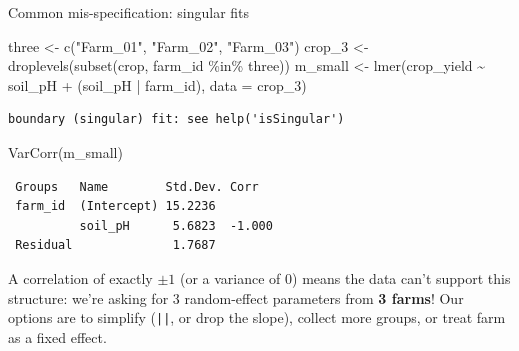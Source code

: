 \documentclass[
  ignorenonframetext,
  aspectratio=169,
]{beamer}
\newenvironment{Shaded}{\begin{snugshade}}{\end{snugshade}}
\newcommand{\AttributeTok}[1]{\textcolor[rgb]{0.40,0.45,0.13}{#1}}
\newcommand{\FunctionTok}[1]{\textcolor[rgb]{0.28,0.35,0.67}{#1}}
\newcommand{\NormalTok}[1]{\textcolor[rgb]{0.00,0.23,0.31}{#1}}
\newcommand{\OtherTok}[1]{\textcolor[rgb]{0.00,0.23,0.31}{#1}}
\newcommand{\SpecialCharTok}[1]{\textcolor[rgb]{0.37,0.37,0.37}{#1}}
\newcommand{\StringTok}[1]{\textcolor[rgb]{0.13,0.47,0.30}{#1}}
\begin{document}
\begin{frame}[fragile]{Common mis-specification: singular fits}
\label{common-mis-specification-singular-fits}
\begin{Shaded}
\begin{Highlighting}[]
\NormalTok{three }\OtherTok{\textless{}{-}} \FunctionTok{c}\NormalTok{(}\StringTok{"Farm\_01"}\NormalTok{, }\StringTok{"Farm\_02"}\NormalTok{, }\StringTok{"Farm\_03"}\NormalTok{)}
\NormalTok{crop\_3 }\OtherTok{\textless{}{-}} \FunctionTok{droplevels}\NormalTok{(}\FunctionTok{subset}\NormalTok{(crop, farm\_id }\SpecialCharTok{\%in\%}\NormalTok{ three))}
\NormalTok{m\_small }\OtherTok{\textless{}{-}} \FunctionTok{lmer}\NormalTok{(crop\_yield }\SpecialCharTok{\textasciitilde{}}\NormalTok{ soil\_pH }\SpecialCharTok{+}
\NormalTok{                    (soil\_pH }\SpecialCharTok{|}\NormalTok{ farm\_id), }\AttributeTok{data =}\NormalTok{ crop\_3)}
\end{Highlighting}
\end{Shaded}

\begin{verbatim}
boundary (singular) fit: see help('isSingular')
\end{verbatim}

\scriptsize

\pause

\begin{Shaded}
\begin{Highlighting}[]
\FunctionTok{VarCorr}\NormalTok{(m\_small)}
\end{Highlighting}
\end{Shaded}

\begin{verbatim}
 Groups   Name        Std.Dev. Corr   
 farm_id  (Intercept) 15.2236         
          soil_pH      5.6823  -1.000 
 Residual              1.7687         
\end{verbatim}

\normalsize

\pause

\begin{center}
\small
A correlation of exactly $\pm 1$ (or a variance of 0) means the data can't support this structure: we're asking for 3 random-effect parameters from \textbf{3 farms}! Our options are to simplify (\texttt{||}, or drop the slope), collect more groups, or treat farm as a fixed effect.
\end{center}
\end{frame}
\end{document}

